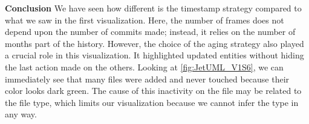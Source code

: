 \textbf{Conclusion}
We have seen how different is the timestamp strategy compared to what we saw in the first visualization. Here, the number of frames does not depend upon the number of commits made; instead, it relies on the number of months part of the history. 
However, the choice of the aging strategy also played a crucial role in this visualization. It highlighted updated entities without hiding the last action made on the others. Looking at \autoref{fig:JetUML_V1S6}, we can immediately see that many files were added and never touched because their color looks dark green. The cause of this inactivity on the file may be related to the file type, which limits our visualization because we cannot infer the type in any way. 



